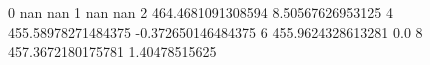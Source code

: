 0 nan nan
1 nan nan
2 464.4681091308594 8.50567626953125
4 455.58978271484375 -0.372650146484375
6 455.9624328613281 0.0
8 457.3672180175781 1.40478515625
